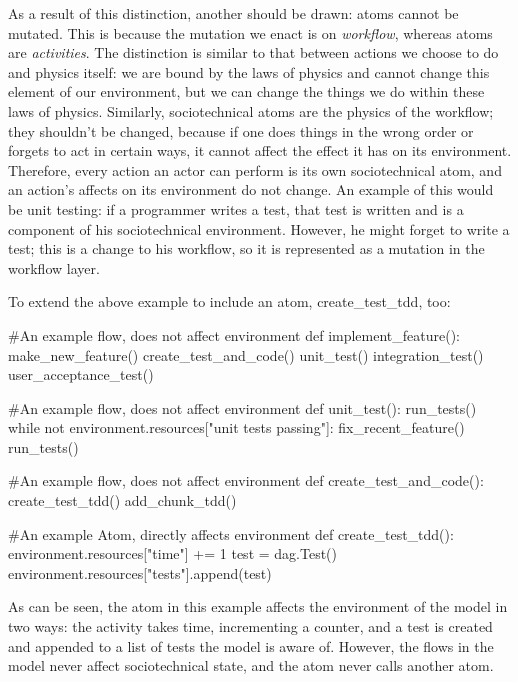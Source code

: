 As a result of this distinction, another should be drawn: atoms cannot be mutated. This is because the mutation we enact is on \emph{workflow}, whereas atoms are \emph{activities}. The distinction is similar to that between actions we choose to do and physics itself: we are bound by the laws of physics and cannot change this element of our environment, but we can change the things we do within these laws of physics. Similarly, sociotechnical atoms are the physics of the workflow; they shouldn't be changed, because if one does things in the wrong order or forgets to act in certain ways, it cannot affect the effect it has on its environment. Therefore, every action an actor can perform is its own sociotechnical atom, and an action's affects on its environment do not change. An example of this would be unit testing: if a programmer writes a test, that test is written and is a component of his sociotechnical environment. However, he might forget to write a test; this is a change to his workflow, so it is represented as a mutation in the workflow layer.  \par
To extend the above example to include an atom, create\_test\_tdd\(\), too:\label{large_code_sample}
\begin{pyglist}[language = python, encoding = utf8]
#An example flow, does not affect environment
def implement_feature():
    make_new_feature()
    create_test_and_code()
    unit_test()
    integration_test()
    user_acceptance_test()

#An example flow, does not affect environment
def unit_test():
    run_tests()
    while not environment.resources["unit tests passing"]:
        fix_recent_feature()
        run_tests()

#An example flow, does not affect environment
def create_test_and_code():
    create_test_tdd()
    add_chunk_tdd()
    
#An example Atom, directly affects environment
def create_test_tdd():
    environment.resources["time"] += 1
    test = dag.Test()
    environment.resources["tests"].append(test)

\end{pyglist}\par
As can be seen, the atom in this example affects the environment of the model in two ways: the activity takes time, incrementing a counter, and a test is created and appended to a list of tests the model is aware of. However, the flows in the model never affect sociotechnical state, and the atom never calls another atom. 

